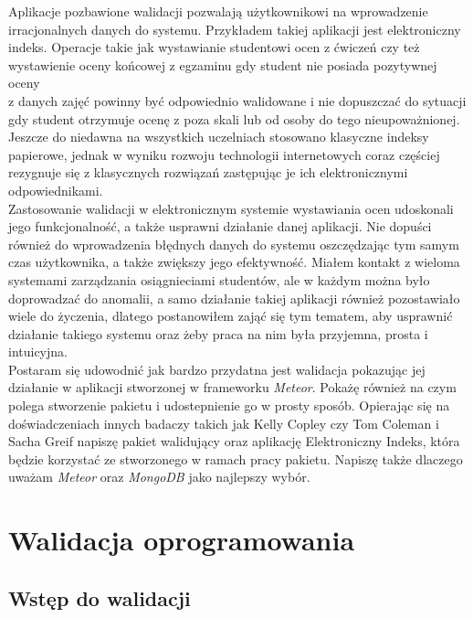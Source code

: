 \documentclass[brudnopis]{xmgr}
\begin{document}
\textcolor{wa}{Aplikacje pozbawione walidacji pozwalają użytkownikowi na wprowadzenie
irracjonalnych danych do systemu.} \textcolor{wb}{Przykładem takiej aplikacji jest elektroniczny indeks.
Operacje takie jak wystawianie studentowi ocen z ćwiczeń czy też wystawienie
oceny końcowej z egzaminu gdy student nie posiada pozytywnej oceny
\\
z danych zajęć powinny być odpowiednio
walidowane i nie dopuszczać do sytuacji gdy student otrzymuje ocenę z poza skali lub od osoby do tego nieupoważnionej.}
\textcolor{wb}{Jeszcze do niedawna na wszystkich uczelniach stosowano klasyczne indeksy papierowe,
jednak w wyniku rozwoju technologii internetowych coraz częściej rezygnuje się z klasycznych
rozwiązań zastępując je ich elektronicznymi odpowiednikami.}
\\

\textcolor{wc}{Zastosowanie walidacji w elektronicznym
systemie wystawiania ocen udoskonali jego funkcjonalność, a także usprawni działanie danej aplikacji.
Nie dopuści również do wprowadzenia błędnych danych do systemu oszczędzając tym samym czas użytkownika,
a także zwiększy jego efektywność. Miałem kontakt z wieloma systemami zarządzania osiągnieciami studentów, ale w każdym można było doprowadzać
do anomalii, a samo działanie takiej aplikacji również pozostawiało wiele do życzenia, dlatego postanowiłem zająć się tym tematem,
aby usprawnić działanie takiego systemu oraz żeby praca na nim była przyjemna, prosta i intuicyjna. }
\\

\textcolor{wa}{Postaram się udowodnić jak bardzo przydatna jest walidacja pokazując jej działanie w aplikacji
stworzonej w frameworku \textit{Meteor}. Pokażę również na czym polega stworzenie pakietu i udostepnienie
go w prosty sposób.} \textcolor{wd}{Opierając się na doświadczeniach innych badaczy takich jak Kelly Copley \cite{Mesosphere}
czy Tom Coleman i Sacha Greif \cite{DiscoverMeteor2013} napiszę pakiet walidujący oraz aplikację Elektroniczny Indeks,
która będzie korzystać ze stworzonego w ramach pracy pakietu.} \textcolor{wa}{Napiszę także dlaczego uważam \textit{Meteor} oraz \textit{MongoDB} jako 
najlepszy wybór.}




\chapter{Walidacja oprogramowania}

\section{Wstęp do walidacji}
\cite{Validation}
\end{document}
